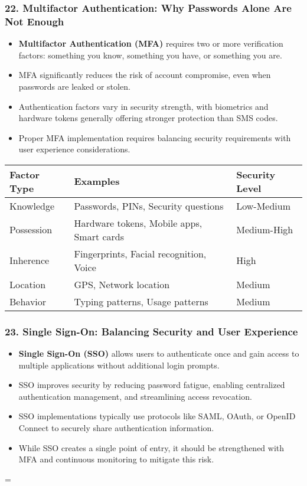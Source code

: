 \documentclass{beamer}
\begin{document}
	\begin{frame}
		\frametitle{22. Multifactor Authentication: Why Passwords Alone Are Not Enough}
		\begin{itemize}
			\item \textbf{Multifactor Authentication (MFA)} requires two or more verification factors: something you know, something you have, or something you are.
			\item MFA significantly reduces the risk of account compromise, even when passwords are leaked or stolen.
			\item Authentication factors vary in security strength, with biometrics and hardware tokens generally offering stronger protection than SMS codes.
			\item Proper MFA implementation requires balancing security requirements with user experience considerations.
		\end{itemize}
		
		\begin{table}
			\scriptsize
			\begin{tabular}{|l|l|l|}
				\hline
				\textbf{Factor Type} & \textbf{Examples} & \textbf{Security Level} \\
				\hline
				Knowledge & Passwords, PINs, Security questions & Low-Medium \\
				\hline
				Possession & Hardware tokens, Mobile apps, Smart cards & Medium-High \\
				\hline
				Inherence & Fingerprints, Facial recognition, Voice & High \\
				\hline
				Location & GPS, Network location & Medium \\
				\hline
				Behavior & Typing patterns, Usage patterns & Medium \\
				\hline
			\end{tabular}
		\end{table}
	\end{frame}
	
	\begin{frame}
		\frametitle{23. Single Sign-On: Balancing Security and User Experience}
		\begin{itemize}
			\item \textbf{Single Sign-On (SSO)} allows users to authenticate once and gain access to multiple applications without additional login prompts.
			\item SSO improves security by reducing password fatigue, enabling centralized authentication management, and streamlining access revocation.
			\item SSO implementations typically use protocols like SAML, OAuth, or OpenID Connect to securely share authentication information.
			\item While SSO creates a single point of entry, it should be strengthened with MFA and continuous monitoring to mitigate this risk.
		\end{itemize}
		
=
		\end{frame}
\end{document}
